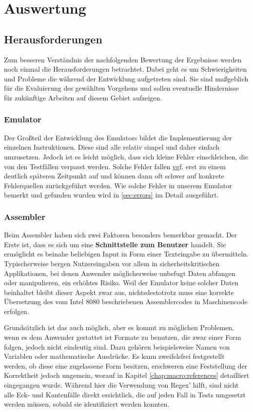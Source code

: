 \chapter{Auswertung}\label{chap:eval}

\section{Herausforderungen}

Zum besseren Verständnis der nachfolgenden Bewertung der Ergebnisse werden noch einmal die Herausforderungen betrachtet. Dabei geht es um Schwierigkeiten und Probleme die während der Entwicklung aufgetreten sind. Sie sind maßgeblich für die Evaluierung des gewählten Vorgehens und sollen eventuelle Hindernisse für zukünftige Arbeiten auf diesem Gebiet aufzeigen.

\subsection{Emulator}

Der Großteil der Entwicklung des Emulators bildet die Implementierung der einzelnen Instruktionen. Diese sind alle relativ simpel und daher einfach umzusetzen. Jedoch ist es leicht möglich, dass sich kleine Fehler einschleichen, die von den Testfällen verpasst werden. Solche Fehler fallen ggf. erst zu einem deutlich späteren Zeitpunkt auf und können dann oft schwer auf konkrete Fehlerquellen zurückgeführt werden. Wie solche Fehler in unserem Emulator bemerkt und gefunden wurden wird in \cref{sec:errors} im Detail ausgeführt.

\subsection{Assembler}

Beim Assembler haben sich zwei Faktoren besonders bemerkbar gemacht. Der Erste ist, dass es sich um eine \textbf{Schnittstelle zum Benutzer} handelt. Sie ermöglicht es beinahe beliebigen Input in Form einer Texteingabe zu übermitteln. Typischerweise bergen Nutzereingaben vor allem in sicherheitskritischen Applikationen, bei denen Anwender möglicherweise unbefugt Daten abfangen oder manipulieren, ein erhöhtes Risiko. Weil der Emulator keine solcher Daten beinhaltet bleibt dieser Aspekt zwar aus, nichtsdestotrotz muss eine korrekte Übersetzung des vom Intel 8080 beschriebenen Assemblercodes in Maschinencode erfolgen.

Grundsätzlich ist das auch möglich, aber es kommt zu möglichen Problemen, wenn es dem Anwender gestattet ist Formate zu benutzen, die zwar einer Form folgen, jedoch nicht eindeutig sind. Dazu gehören beispielsweise Namen von Variablen oder mathematische Ausdrücke. Es kann zweifelsfrei festgestellt werden, ob diese eine zugelassene Form besitzen, erschweren eine Feststellung der Korrektheit jedoch ungemein, worauf in Kapitel \ref{chap:macro:references} detailliert eingegangen wurde. Während hier die Verwendung von Regex' hilft, sind nicht alle Eck- und Kantenfälle direkt ersichtlich, die auf jeden Fall in Tests umgesetzt werden müssen, sobald sie identifiziert werden konnten.

